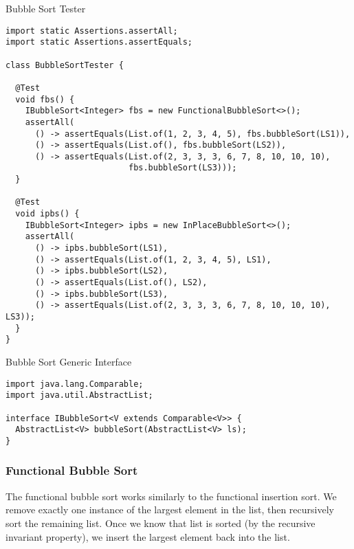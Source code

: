 \begin{cl}[]{Bubble Sort Tester}
\begin{lstlisting}[language=MyJava]
import static Assertions.assertAll;
import static Assertions.assertEquals;

class BubbleSortTester {

  @Test
  void fbs() {
    IBubbleSort<Integer> fbs = new FunctionalBubbleSort<>();
    assertAll(
      () -> assertEquals(List.of(1, 2, 3, 4, 5), fbs.bubbleSort(LS1)),
      () -> assertEquals(List.of(), fbs.bubbleSort(LS2)),
      () -> assertEquals(List.of(2, 3, 3, 3, 6, 7, 8, 10, 10, 10), 
                         fbs.bubbleSort(LS3)));
  }

  @Test
  void ipbs() {
    IBubbleSort<Integer> ipbs = new InPlaceBubbleSort<>();
    assertAll(
      () -> ipbs.bubbleSort(LS1),
      () -> assertEquals(List.of(1, 2, 3, 4, 5), LS1),
      () -> ipbs.bubbleSort(LS2),
      () -> assertEquals(List.of(), LS2),
      () -> ipbs.bubbleSort(LS3),
      () -> assertEquals(List.of(2, 3, 3, 3, 6, 7, 8, 10, 10, 10), LS3));
  }
}
\end{lstlisting}
\end{cl}

\begin{cl}[]{Bubble Sort Generic Interface}
\begin{lstlisting}[language=MyJava]
import java.lang.Comparable;
import java.util.AbstractList;

interface IBubbleSort<V extends Comparable<V>> {
  AbstractList<V> bubbleSort(AbstractList<V> ls);
}
\end{lstlisting}
\end{cl}

\subsubsection*{Functional Bubble Sort}
The functional bubble sort works similarly to the functional insertion sort. We remove exactly one instance of the largest element in the list, then recursively sort the remaining list. Once we know that list is sorted (by the recursive invariant property), we insert the largest element back into the list.

